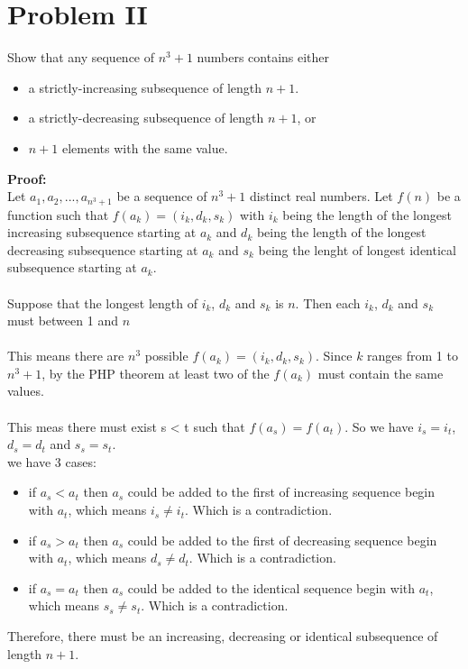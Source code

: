 \section{Problem II}
Show that any sequence of $n^3 + 1$ numbers contains either
\begin{itemize}
	\item a strictly-increasing subsequence of length $n + 1$.
	\item a strictly-decreasing subsequence of length $n + 1$, or
	\item $n + 1$ elements with the same value.
\end{itemize}
\textbf{Proof:} \\
 Let $a_1, a_2, ..., a_{n^3 + 1}$ be a sequence of $n^3 + 1$ distinct real numbers. Let $f(n)$ be a function such that $ f(a_k) = (i_k, d_k, s_k) $ with $i_k$ being the length of the longest increasing subsequence starting at $a_k$ and $d_k$ being the length of the longest decreasing subsequence starting at $a_k$ and $s_k$ being the lenght of longest identical subsequence starting at $a_k$. \\
 \\
Suppose that the longest length of $i_k$, $d_k$ and $s_k$ is $n$. Then each $i_k$, $d_k$ and $s_k$ must between 1 and $n$\\
\\
This means there are $n^3$ possible $f(a_k) = (i_k, d_k, s_k)$. Since $k$ ranges from 1 to $n^3 + 1$, by the PHP theorem at least two of the $f(a_k)$ must contain the same values.\\
\\
This meas there must exist s < t such that $f(a_s) = f(a_t)$. So we have $i_s = i_t$, $d_s = d_t$ and $s_s = s_t$.\\
we have 3 cases:\\
\begin{itemize}
	\item if $a_s < a_t$ then $a_s$ could be added to the first of increasing sequence begin with $a_t$, which means $ i_s \ne i_t $. Which is a contradiction.
	\item if $a_s > a_t$ then $a_s$ could be added to the first of decreasing sequence begin with $a_t$, which means $ d_s \ne d_t $. Which is a contradiction.
	\item if $a_s = a_t$ then $a_s$ could be added to the identical sequence begin with $a_t$, which means $ s_s \ne s_t $. Which is a contradiction.
\end{itemize}

Therefore, there must be an increasing, decreasing or identical subsequence of length $n+1$.
